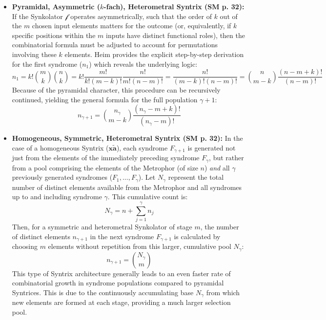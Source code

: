 \documentclass[12pt]{article}
\newcommand{\homogeneoussyntrix}{\bm{x\widetilde{a}}}
\newcommand{\synkolator}{\mathcal{f}}
\newcommand{\synkolationsstufe}{m}
\newcommand{\syndrom}{F} %
\begin{document}
\begin{itemize}
    \item \textbf{Pyramidal, Asymmetric (\( k \)-fach), Heterometral Syntrix (SM p. 32):}
    If the Synkolator \( \synkolator \) operates asymmetrically, such that the order of \( k \) out of the \( \synkolationsstufe \) chosen input elements matters for the outcome (or, equivalently, if \( k \) specific positions within the \( \synkolationsstufe \) inputs have distinct functional roles), then the combinatorial formula must be adjusted to account for permutations involving these \( k \) elements. Heim provides the explicit step-by-step derivation for the first syndrome (\(n_1\)) which reveals the underlying logic: 
    \begin{equation*}
    n_1 = k! \binom{m}{k}\binom{n}{k} = k! \frac{m!}{k!(m-k)!} \frac{n!}{m!(n-m)!} = \frac{n!}{(m-k)!(n-m)!} = \binom{n}{m-k} \frac{(n-m+k)!}{(n-m)!} 
    \end{equation*}
    Because of the pyramidal character, this procedure can be recursively continued, yielding the general formula for the full population \(\gamma+1\):
    \begin{equation*}
    n_{\gamma+1} = \binom{n_\gamma}{\synkolationsstufe-k} \frac{(n_\gamma-\synkolationsstufe+k)!}{(n_\gamma-\synkolationsstufe)!}
    \end{equation*}

    \item \textbf{Homogeneous, Symmetric, Heterometral Syntrix (SM p. 32):}
    In the case of a homogeneous Syntrix (\(\homogeneoussyntrix\)), each syndrome \( \syndrom_{\gamma+1} \) is generated not just from the elements of the immediately preceding syndrome \( \syndrom_\gamma \), but rather from a pool comprising the elements of the Metrophor (of size \( n \)) \textit{and} all \( \gamma \) previously generated syndromes (\( \syndrom_1, \dots, \syndrom_\gamma \)). Let \( N_\gamma \) represent the total number of distinct elements available from the Metrophor and all syndromes up to and including syndrome \( \gamma \). This cumulative count is:
    \begin{equation*}
    N_\gamma = n + \sum_{j=1}^\gamma n_j
    \end{equation*}
    Then, for a symmetric and heterometral Synkolator of stage \( \synkolationsstufe \), the number of distinct elements \( n_{\gamma+1} \) in the next syndrome \( \syndrom_{\gamma+1} \) is calculated by choosing \( \synkolationsstufe \) elements without repetition from this larger, cumulative pool \( N_\gamma \):
    \begin{equation*}
    n_{\gamma+1} = \binom{N_\gamma}{\synkolationsstufe} 
    \end{equation*}
    This type of Syntrix architecture generally leads to an even faster rate of combinatorial growth in syndrome populations compared to pyramidal Syntrices. This is due to the continuously accumulating base \( N_\gamma \) from which new elements are formed at each stage, providing a much larger selection pool.


\end{itemize}
\end{document}
